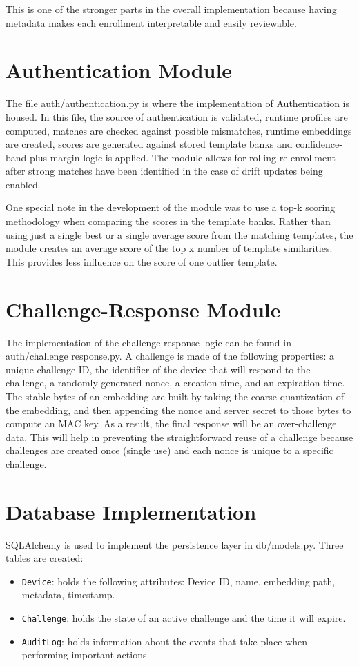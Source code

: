 This is one of the stronger parts in the overall implementation because having metadata makes each enrollment interpretable and easily reviewable.

\section{Authentication Module}
The file auth/authentication.py is where the implementation of Authentication is housed. In this file, the source of authentication is validated, runtime profiles are computed, matches are checked against possible mismatches, runtime embeddings are created, scores are generated against stored template banks and confidence-band plus margin logic is applied. The module allows for rolling re-enrollment after strong matches have been identified in the case of drift updates being enabled.

One special note in the development of the module was to use a top-k scoring methodology when comparing the scores in the template banks. Rather than using just a single best or a single average score from the matching templates, the module creates an average score of the top x number of template similarities. This provides less influence on the score of one outlier template.

\section{Challenge-Response Module}
The implementation of the challenge-response logic can be found in auth/challenge response.py. A challenge is made of the following properties: a unique challenge ID, the identifier of the device that will respond to the challenge, a randomly generated nonce, a creation time, and an expiration time. The stable bytes of an embedding are built by taking the coarse quantization of the embedding, and then appending the nonce and server secret to those bytes to compute an MAC key. As a result, the final response will be an over-challenge data. This will help in preventing the straightforward reuse of a challenge because challenges are created once (single use) and each nonce is unique to a specific challenge.

\section{Database Implementation}
SQLAlchemy is used to implement the persistence layer in db/models.py. Three tables are created:
\begin{itemize}
	\item \texttt{Device}: holds the following attributes: Device ID, name, embedding path, metadata, timestamp.
	\item \texttt{Challenge}: holds the state of an active challenge and the time it will expire.
	\item \texttt{AuditLog}: holds information about the events that take place when performing important actions.
\end{itemize}

